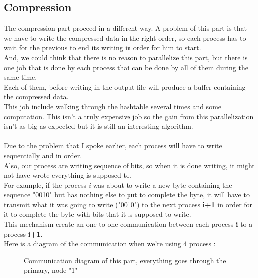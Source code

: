 \subsection{Compression}
The compression part proceed in a different way. A problem of this part is that we have to write the compressed data in the right order, so each process has to wait for the previous to end its writing in order for him to start.\\
And, we could think that there is no reason to parallelize this part, but there is one job that is done by each process that can be done by all of them during the same time.\\
Each of them, before writing in the output file will produce a buffer containing the compressed data.\\
This job include walking through the hashtable several times and some computation. This isn't a truly expensive job so the gain from this parallelization isn't as big as expected but it is still an interesting algorithm.\\
\\
Due to the problem that I spoke earlier, each process will have to write sequentially and in order.\\
Also, our process are writing sequence of bits, so when it is done writing, it might not have wrote everything is supposed to.\\
For example, if the process \textit{i} was about to write a new byte containing the sequence "0010" but has nothing else to put to complete the byte, it will have to transmit what it was going to write ("0010") to the next process \textbf{i+1} in order for it to complete the byte with bits that it is supposed to write.\\
This mechanism create an one-to-one communication between each process \textbf{i} to a process \textbf{i+1}.\\
Here is a diagram of the communication when we're using 4 process :
\begin{figure}[H]
\centering
{} 
\caption{Communication diagram of this part, everything goes through the primary, node "1"}
\label{fig:my_label}
\end{figure}

